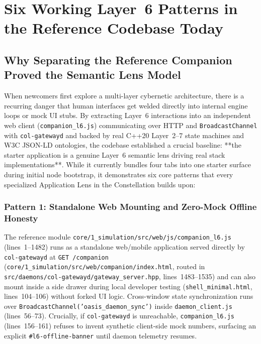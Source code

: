 \section{Six Working Layer~6 Patterns in the Reference Codebase Today}
\label{sec:reference-highlights}

\subsection{Why Separating the Reference Companion Proved the Semantic Lens Model}

When newcomers first explore a multi-layer cybernetic architecture, there is a recurring danger that human interfaces get welded directly into internal engine loops or mock UI stubs. By extracting Layer~6 interactions into an independent web client (\texttt{companion\_l6.js}) communicating over HTTP and \texttt{BroadcastChannel} with \texttt{col-gatewayd} and backed by real C++20 Layer~2--7 state machines and W3C JSON-LD ontologies, the codebase established a crucial baseline: **the starter application is a genuine Layer~6 semantic lens driving real stack implementations**. While it currently bundles four tabs into one starter surface during initial node bootstrap, it demonstrates six core patterns that every specialized Application Lens in the Constellation builds upon:

\subsubsection{Pattern 1: Standalone Web Mounting and Zero-Mock Offline Honesty}
The reference module \texttt{core/1\_simulation/src/web/js/companion\_l6.js} (lines~1--1482) runs as a standalone web/mobile application served directly by \texttt{col-gatewayd} at \texttt{GET /companion} (\texttt{core/1\_simulation/src/web/companion/index.html}, routed in \texttt{src/daemons/col-gatewayd/gateway\_server.hpp}, lines~1483--1535) and can also mount inside a side drawer during local developer testing (\texttt{shell\_minimal.html}, lines~104--106) without forked UI logic. Cross-window state synchronization runs over \texttt{BroadcastChannel('oasis\_daemon\_sync')} inside \texttt{daemon\_client.js} (lines~56--73). Crucially, if \texttt{col-gatewayd} is unreachable, \texttt{companion\_l6.js} (lines~156--161) refuses to invent synthetic client-side mock numbers, surfacing an explicit \texttt{\#l6-offline-banner} until daemon telemetry resumes.

